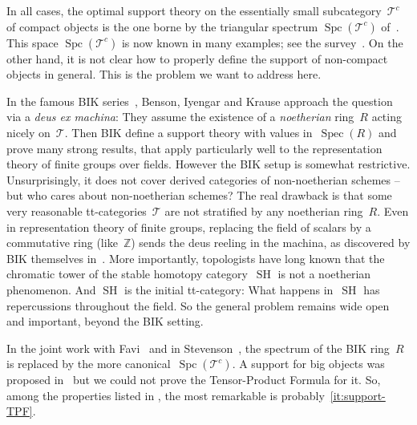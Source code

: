 \documentclass[11pt]{article}
\numberwithin{equation}{section}
\theoremstyle{definition}
\DeclareMathOperator{\Spc}{Spc}
\DeclareMathOperator{\Spec}{Spec}
\newcommand{\bbZ}{\mathbb{Z}}
\newcommand{\cat}[1]{\mathscr{#1}}
\DeclareMathOperator{\SH}{SH}
\newcommand{\cT}{\cat{T}}
\newcommand{\SpcT}{\Spc(\cat{T}^c)}
\begin{document}
In all cases, the optimal support theory on the essentially small subcategory~$\cT^c$ of compact objects is the one borne by the triangular spectrum $\SpcT$ of~\cite{Balmer05a}. This space $\SpcT$ is now known in many examples; see the survey~\cite{Balmer19}. On the other hand, it is not clear how to properly define the support of non-compact objects in general. This is the problem we want to address here.

In the famous BIK series~\cite{BensonIyengarKrause08,BensonIyengarKrause11c,BensonIyengarKrause11a,BensonIyengarKrause12a,BensonIyengarKrause12b}, Benson, Iyengar and Krause approach the question via a \textsl{deus ex machina}: They assume the existence of a \emph{noetherian} ring~$R$ acting nicely on~$\cT$. Then BIK define a support theory with values in~$\Spec(R)$ and prove many strong results, that apply particularly well to the representation theory of finite groups over fields. However the BIK setup is somewhat restrictive. Unsurprisingly, it does not cover derived categories of non-noetherian schemes -- but who cares about non-noetherian schemes? The real drawback is that some very reasonable tt-categories~$\cT$ are not stratified by any noetherian ring~$R$. Even in representation theory of finite groups, replacing the field of scalars by a commutative ring (like~$\bbZ$) sends the deus reeling in the machina, as discovered by BIK themselves in~\cite{BensonIyengarKrause13}. More importantly, topologists have long known that the chromatic tower of the stable homotopy category~$\SH$ is not a noetherian phenomenon. And $\SH$ is the initial tt-category: What happens in~$\SH$ has repercussions throughout the field. So the general problem remains wide open and important, beyond the BIK setting.

In the joint work with Favi~\cite{BalmerFavi11} and in Stevenson~\cite{Stevenson13}, the spectrum of the BIK ring~$R$ is replaced by the more canonical~$\SpcT$. A support for big objects was proposed in~\cite{BalmerFavi11} but we could not prove the Tensor-Product Formula for it. So, among the properties listed in , the most remarkable is probably~\eqref{it:support-TPF}.
\end{document}
